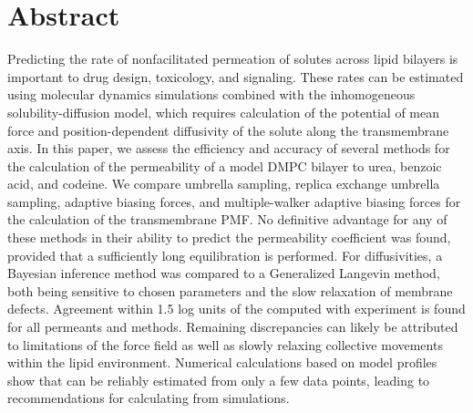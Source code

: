 
\section{Abstract}
Predicting the rate of nonfacilitated permeation of solutes across lipid bilayers is important to drug design, toxicology, and signaling. These rates can be estimated using molecular dynamics simulations combined with the inhomogeneous solubility-diffusion model, which requires calculation of the potential of mean force and position-dependent diffusivity of the solute along the transmembrane axis. In this paper, we assess the efficiency and accuracy of several methods for the calculation of the permeability of a model DMPC bilayer to urea, benzoic acid, and codeine. We compare umbrella sampling, replica exchange umbrella sampling, adaptive biasing forces, and multiple-walker adaptive biasing forces for the calculation of the transmembrane PMF. No definitive advantage for any of these methods in their ability to predict the permeability coefficient \perm was found, provided that a sufficiently long equilibration is performed. For diffusivities, a Bayesian inference method was compared to a Generalized Langevin method, both being sensitive to chosen parameters and the slow relaxation of membrane defects. Agreement within 1.5 log units of the computed \perm with experiment is found for all permeants and methods.  Remaining discrepancies can likely be attributed to limitations of the force field as well as slowly relaxing collective movements within the lipid environment.  Numerical calculations based on model profiles show that \perm can be reliably estimated from only a few data points, leading to recommendations for calculating \perm from simulations.


